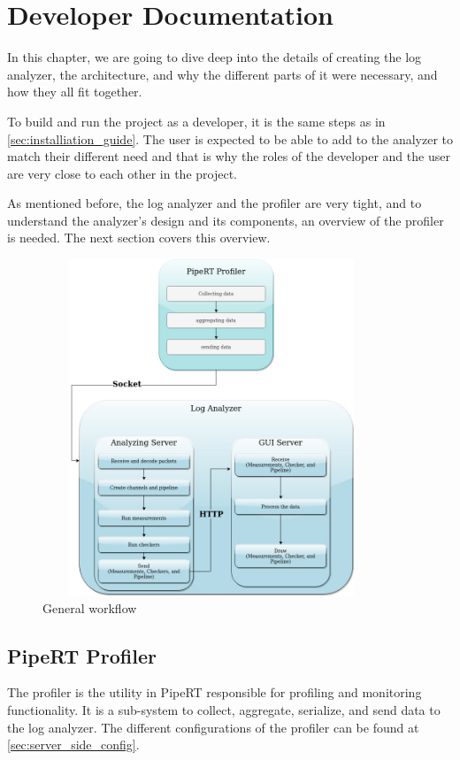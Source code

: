 \chapter{Developer Documentation} %
\label{ch:impl}

In this chapter, we are going to dive deep into the details of creating the log analyzer,
the architecture, and why the different parts of it were necessary, and how they all fit together.

To build and run the project as a developer, it is the same steps as in \ref{sec:installiation_guide}.
The user is expected to be able to add to the analyzer to match their different need and that is why
the roles of the developer and the user are very close to each other in the project.

As mentioned before, the log analyzer and the profiler are very tight, and to understand the analyzer's
design and its components, an overview of the profiler is needed. The next section covers this overview.
\newline
\begin{figure}[H]
	\centering
	\includegraphics[width=0.9\textwidth,height=380px]{images/general_work_flow.jpg}
	\caption{General workflow}
	\label{fig:general_work_flow}
\end{figure}

\section{PipeRT Profiler} %
The profiler is the utility in PipeRT responsible for profiling and monitoring functionality. It is a
sub-system to collect, aggregate, serialize, and send data to the log analyzer. The different configurations
of the profiler can be found at \ref{sec:server_side_config}.

